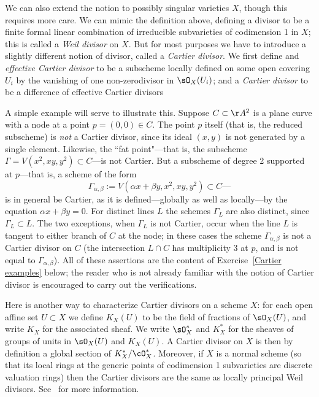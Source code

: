 We can also extend the notion to possibly singular varieties $X$, though this requires more care. We can mimic the definition above, defining a divisor to be a finite formal linear combination of irreducible subvarieties of codimension 1 in $X$; this is called a \emph{Weil divisor} on $X$. But for most purposes we have to introduce a slightly different notion of divisor, called a \emph{Cartier divisor}. We first define and \emph{effective Cartier divisor} to be a subscheme locally defined on some open covering $U_{i}$ by the vanishing of one non-zerodivisor in $\sO_{X}(U_{i})$; and a \emph{Cartier divisor} to be a difference of effective Cartier divisors

A simple example will serve to illustrate this. Suppose $C \subset \AA^2$ is a plane curve with a node at a point $p = (0,0) \in C$. The point $p$ itself (that is, the reduced subscheme) is \emph{not} a Cartier divisor, since its ideal $(x,y)$ is not generated by a single element. Likewise, the ``fat point"---that is, the subscheme $\Gamma = V(x^2, xy, y^2) \subset C$---is not Cartier. But a subscheme of degree 2 supported at $p$---that is, a scheme of the form
$$
\Gamma_{\alpha, \beta} := V(\alpha x + \beta y, x^2, xy, y^2) \subset C \text{---}
$$
is in general be Cartier, as it is defined---globally as well as locally---by the equation $\alpha x + \beta y = 0$. 
For distinct lines $L$ the schemes $\Gamma_{L}$ are also distinct, since $\Gamma_{L}\subset L$. The two exceptions, when $\Gamma_{L}$ is not Cartier, occur when the line $L$ is tangent to either branch of $C$ at the node; in these cases the scheme $\Gamma_{\alpha, \beta}$ is not a Cartier divisor on $C$ (the intersection $L \cap C$ has multiplicity 3 at $p$, and is not equal to $\Gamma_{\alpha, \beta}$). All of these assertions are the content of Exercise~\ref{Cartier examples} below; the reader who is not already familiar with the notion of Cartier divisor is encouraged to carry out the verifications.

Here is another way to characterize Cartier divisors on a scheme $X$: for each open affine set $U\subset X$ we define $K_X(U)$ to be the field of fractions of $\sO_X(U)$, and write $K_X$ for the
associated sheaf. We write $\sO_X^*$ and $K_X^*$ for the sheaves of groups of units in $\sO_X(U)$ and $K_X(U)$.
A Cartier divisor on $X$ is then by definition a global section of $K_X^*/\cO_X^*$. 
Moreover, if $X$ is a normal scheme (so that its local rings at the generic points of codimension 1 subvarieties are discrete valuation rings) then the Cartier divisors are the same as locally principal Weil divisors. See~\cite[Section II.6]{Hartshorne1977} for more information. 

